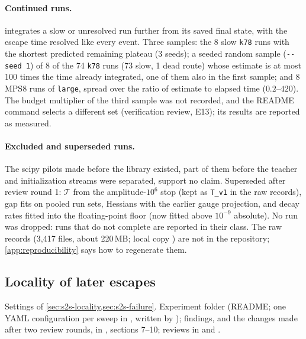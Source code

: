 \paragraph{Continued runs.}
 integrates a slow or unresolved run further from its saved final state, with the
escape time resolved like every event. Three samples: the 8 slow \texttt{k78} runs with the shortest predicted
remaining plateau (3 seeds); a seeded random sample (\texttt{-{}-seed 1}) of 8 of the 74 \texttt{k78} runs (73
slow, 1 dead route) whose estimate is at most 100 times the time already integrated, one of them also in the
first sample; and 8 MPS8 runs of \texttt{large}, spread over the ratio of estimate to elapsed time
($0.2$--$420$). The budget multiplier of the third sample was not recorded, and the README command selects a
different set (verification review, E13); its results are reported as measured.

\paragraph{Excluded and superseded runs.}
The scipy pilots made before the library existed, part of them before the teacher and initialization streams
were separated, support no claim. Superseded after review round 1: $\mathcal T$ from the amplitude-$10^6$ stop (kept as
\texttt{T\_v1} in the raw records), gap fits on pooled run sets, Hessians with the earlier gauge projection, and
decay rates fitted into the floating-point floor (now fitted above $10^{-9}$ absolute). No run was dropped:
runs that do not complete are reported in their class. The raw records (3,417 files, about 220\,MB; local copy
) are not in the repository; \cref{app:reproducibility} says how to regenerate them.

\subsection{Locality of later escapes}\label{app:exp-locality}
Settings of \cref{sec:s2s-locality,sec:s2s-failure}. Experiment folder 
(README; one YAML configuration per sweep in , written by );
findings, and the changes made after two review rounds, in , sections 7--10;
reviews in  and
.

